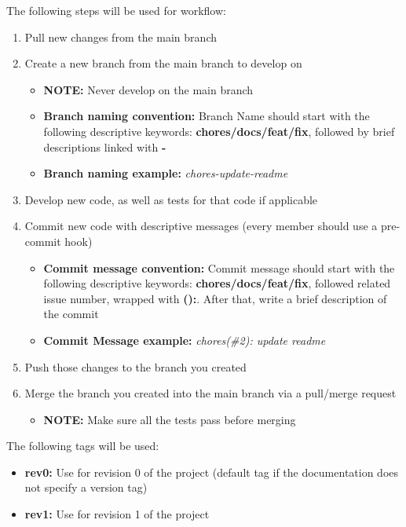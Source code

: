 \documentclass{article}
\begin{document}
The following steps will be used for workflow:
\begin{enumerate}
	\item Pull new changes from the main branch
	\item Create a new branch from the main branch to develop on
    \begin{itemize}
        \item \textbf{NOTE:} Never develop on the main branch
        \item \textbf{Branch naming convention:} Branch Name should start with the following descriptive keywords: \textbf{chores/docs/feat/fix}, followed by brief descriptions linked with \textbf{-}
        \item \textbf{Branch naming example:} \textit{chores-update-readme}
    \end{itemize}
	\item Develop new code, as well as tests for that code if applicable
	\item Commit new code with descriptive messages (every member should use a pre-commit hook)
        \begin{itemize}
        \item \textbf{Commit message convention:} Commit message should start with the following descriptive keywords: \textbf{chores/docs/feat/fix}, followed related issue number, wrapped with \textbf{():}. After that, write a brief description of the commit
        \item \textbf{Commit Message example:} \textit{chores(\#2): update readme}
        \end{itemize}
	\item Push those changes to the branch you created
	\item Merge the branch you created into the main branch via a pull/merge request
    \begin{itemize}
        \item \textbf{NOTE:} Make sure all the tests pass before merging \\
    \end{itemize}
\end{enumerate}

The following tags will be used:
\begin{itemize}
    \item \textbf{rev0:} Use for revision 0 of the project (default tag if the documentation does not specify a version tag)
    \item \textbf{rev1:} Use for revision 1 of the project \\
\end{itemize}
\end{document}
